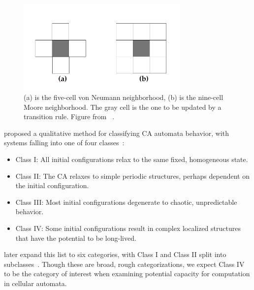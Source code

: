 \documentclass[a4paper,11pt]{article}
\begin{document}
\begin{figure}[thp]
\centering
\includegraphics[width=0.75\textwidth]{mi96_fig3_neighborhoods}
\caption[CA Neighborhood Stencils]{
	(a) is the five-cell von Neumann neighborhood, (b) is the nine-cell Moore neighborhood. The gray cell is the one to be updated by a transition rule. Figure from \citeauthor{mi96}~\cite{mi96}.
}
\label{fig:neighborhoods}
\end{figure}

\medskip

\citeauthor{wf84} proposed a qualitative method for classifying CA automata behavior, with systems falling into one of four classes~\cite{mi96,wf84}:
\begin{itemize}[noitemsep, nolistsep]
\item Class I: All initial configurations relax to the same fixed, homogeneous state.
\item Class II: The CA relaxes to simple periodic structures, perhaps dependent on the initial configuration.
\item Class III: Most initial configurations degenerate to chaotic, unpredictable behavior.
\item Class IV: Some initial configurations result in complex localized structures that have the potential to be long-lived.
\end{itemize}

\noindent \citeauthor{li90b} later expand this list to six categories, with Class I and Class II split into subclasses~\cite{li90b}. Though these are broad, rough categorizations, we expect Class IV to be the category of interest when examining potential capacity for computation in cellular automata.
\end{document}
